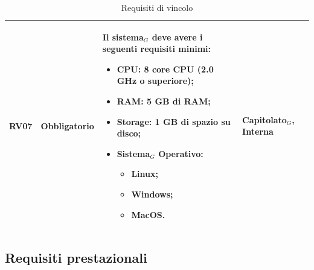 \documentclass[10pt]{article}
\begin{document}
\begin{justify}
\begin{table}[H]
\begin{tabular}{|>{\centering\arraybackslash}m{2.7cm}|>{\centering\arraybackslash}m{2.7cm}|>{\centering\arraybackslash}m{6cm}|>{\centering\arraybackslash}m{2.1cm}|}
\hline 
RV07 & Obbligatorio & Il sistema$_G$ deve avere i seguenti requisiti minimi:
\begin{itemize} %
    \item CPU: 8 core CPU (2.0 GHz o superiore);
    \item RAM: 5 GB di RAM;
    \item Storage: 1 GB di spazio su disco;
    \item Sistema$_G$ Operativo:
    \begin{itemize}
        \item Linux;
        \item Windows;
        \item MacOS.
    \end{itemize}
\end{itemize} & Capitolato$_G$, Interna\\
\hline 
\end{tabular}

\caption{Requisiti di vincolo}
\end{table}


\newpage
\subsection{Requisiti prestazionali}


\end{justify}
\end{document}
